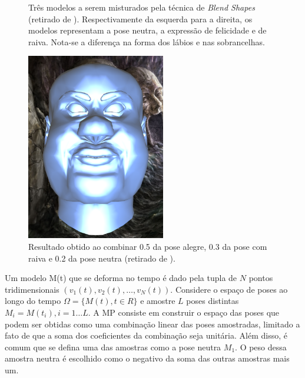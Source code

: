 {\begin{figure}[!htb]
\caption{Três modelos a serem misturados pela técnica de \textit{Blend Shapes}
(retirado de \cite{tutorial-supremo-on-blend-shapes}). Respectivamente da
esquerda para a direita, os modelos representam a pose neutra, a expressão de
felicidade e de raiva. Nota-se a diferença na forma dos lábios e nas sobrancelhas.}

\label{fig:blend-shapes-example-input} 
\end{figure}

\begin{figure}[!htb]
   \centering
  \includegraphics[width=0.6\linewidth]{./figs/outputOfBlendShapes.png}

\caption{Resultado obtido ao combinar 0.5 da pose alegre, 0.3 da pose com raiva e 0.2 da pose neutra (retirado de \cite{tutorial-supremo-on-blend-shapes}).}

\label{fig:blend-shapes-example-output} 
\end{figure}

    
    Um modelo M(t) que se deforma no tempo é dado pela tupla de $N$ pontos
    tridimensionais $ ( v_1(t), v_2(t), \ldots,  v_N(t))$. Considere o espaço de
    poses ao longo do tempo $\Omega = \{ M(t), t \in R\}$  e amostre $L$ poses
    distintas $M_i = M(t_i), i = 1 \ldots L$. A MP consiste em construir o
    espaço das poses que podem ser obtidas como uma combinação linear das poses
    amostradas, limitado a fato de que a soma dos coeficientes da combinação
    seja unitária. Além disso, é comum que se defina uma das amostras como a
    pose neutra $M_1$. O peso dessa amostra neutra é escolhido como o negativo
    da soma das outras amostras mais um.
    
}
